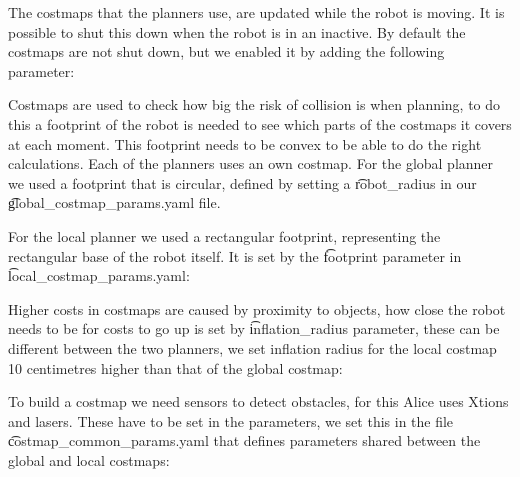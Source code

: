 The costmaps that the planners use, are updated while the robot is moving. It is possible to shut this down when the robot is in an inactive. By default the costmaps are not shut down, but we enabled it by adding the following parameter:



Costmaps are used to check how big the risk of collision is when planning, to do this a footprint of the robot is needed to see which parts of the costmaps it covers at each moment. This footprint needs to be convex to be able to do the right calculations. Each of the planners uses an own costmap. For the global planner we used a footprint that is circular, defined by setting a \t{robot\_radius} in our \t{global_costmap_params.yaml}  file.



For the local planner we used a rectangular footprint, representing the rectangular base of the robot itself. It is set by the \t{footprint} parameter in \t{local_costmap_params.yaml}:



Higher costs in costmaps are caused by proximity to objects, how close the robot needs to be for costs to go up is set by \t{inflation_radius} parameter, these can be different between the two planners, we set inflation radius for the local costmap 10 centimetres higher than that of the global costmap:





To build a costmap we need sensors to detect obstacles, for this Alice uses Xtions and lasers. These have to be set in the parameters, we set this in the file \t{costmap_common_params.yaml} that defines parameters shared between the global and local costmaps:

